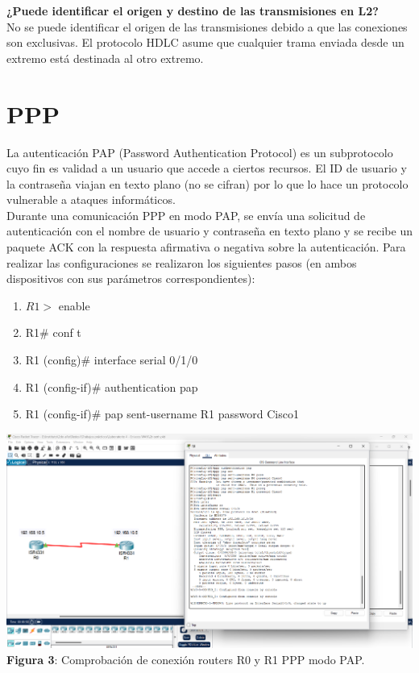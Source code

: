 \documentclass{article}
\begin{document}
    {\bfseries ¿Puede identificar el origen y destino de las transmisiones en L2?} \\
    No se puede identificar el origen de las transmisiones debido a que las conexiones son exclusivas. El protocolo HDLC asume que cualquier trama enviada desde un extremo está destinada al otro extremo.

    \section{PPP}
    La autenticación PAP (Password Authentication Protocol) es un subprotocolo cuyo fin es validad a un usuario que accede a ciertos recursos. El ID de usuario y la contraseña viajan en texto plano (no se cifran) por lo que lo hace un protocolo vulnerable a ataques informáticos.\\
    Durante una comunicación PPP en modo PAP, se envía una solicitud de autenticación con el nombre de usuario y contraseña en texto plano y se recibe un paquete ACK con la respuesta afirmativa o negativa sobre la autenticación. Para realizar las configuraciones se realizaron los siguientes pasos (en ambos dispositivos con sus parámetros correspondientes):
    \begin{enumerate}
        \item $R1>$ enable
        \item R1\# conf t
        \item R1 (config)\# interface serial 0/1/0
        \item R1 (config-if)\# authentication pap
        \item R1 (config-if)\# pap sent-username R1 password Cisco1
    \end{enumerate}

    \begin{center}
        \includegraphics[width=0.875\linewidth]{img_07} 
        \linebreak
        \small {\bfseries Figura 3}: Comprobación de conexión routers R0 y R1 PPP modo PAP.
    \end{center}
\end{document}
